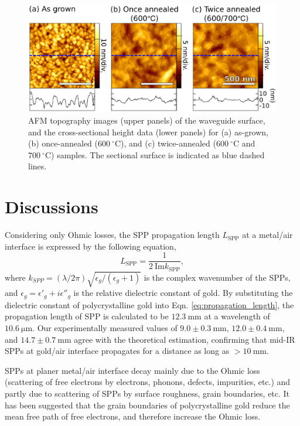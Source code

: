 \documentclass[aip,apl,reprint]{revtex4-1}
\begin{document}
 \begin{figure}
    \includegraphics[width=\hsize]{morphology.eps}
    \caption{AFM topography images (upper panels) of the waveguide surface, and the cross-sectional height data (lower panels) for (a) as-grown, (b) once-annealed ($600\:^\circ\mathrm{C}$), and (c) twice-annealed ($600\:^\circ\mathrm{C}$ and $700\:^\circ\mathrm{C}$) samples. The sectional surface is indicated as blue dashed lines. }
    \label{fig:morphology}
\end{figure}

\section{Discussions}
\label{sec:discussion}
Considering only Ohmic losses, the SPP propagation length $L_{\mathrm{SPP}}$ at a metal/air interface is expressed by the following equation,
\begin{equation}
 L_{\mathrm{SPP}} = \frac{1}{2\:\mathrm{Im} k_{\mathrm{SPP}}},
\label{eq:propagation_length}
 \end{equation}
where $k_{SPP}=(\lambda/2\pi)\sqrt{\epsilon_g/(\epsilon_g+1)}$ is the complex wavenumber of the SPPs, and $\epsilon_g=\epsilon'_g+i\epsilon''_g$ is the relative dielectric constant of gold. 
By substituting the dielectric constant of polycrystalline gold\cite{Palik} into Eqn. \ref{eq:propagation_length}, the propagation length of SPP is calculated to be $12.3\:\mathrm{mm}$ at a wavelength of $10.6\:\mathrm{\mu m}$.
Our experimentally measured values of  $9.0\pm0.3\:\mathrm{mm}$, $12.0\pm0.4\:\mathrm{mm}$, and $14.7\pm0.7\:\mathrm{mm}$ agree with the theoretical estimation, confirming that mid-IR SPPs at gold/air interface propagates for a distance as long as $>10\:\mathrm{mm}$.

SPPs at planer metal/air interface decay mainly due to the Ohmic loss  (scattering of free electrons by electrons, phonons, defects, impurities, etc.) and partly due to scattering of SPPs by surface roughness, grain boundaries, etc\cite{Kuttge, Lee}. It has been suggested that the grain boundaries of polycrystalline gold reduce the mean free path of free electrons, and therefore increase the Ohmic loss\cite{Kuttge, Yang, Trollmann}.
\end{document}

